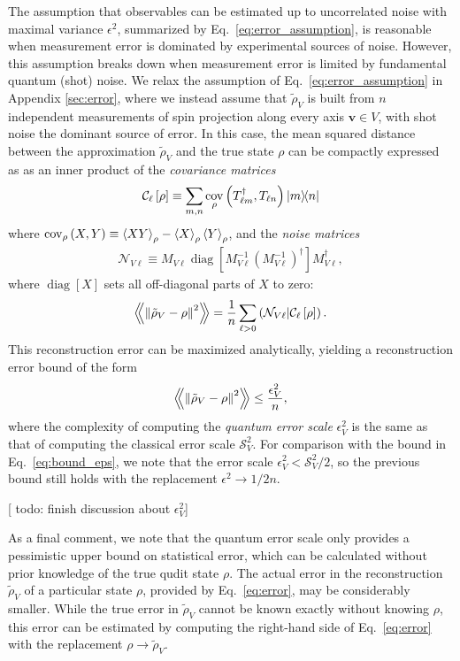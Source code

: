 \documentclass[notitlepage,twocolumn]{revtex4-2}
\newcommand{\f}[2]{\dfrac{#1}{#2}} %
\newcommand{\p}[1]{\left(#1\right)} %
\renewcommand{\sp}[1]{\left[#1\right]} %
\newcommand{\bk}{\Braket} %
\renewcommand{\v}{\bm} %
\newcommand{\Bbk}[1]
{\left\langle\!\!\left\langle #1 \right\rangle\!\!\right\rangle}
\newcommand{\C}{\mathcal{C}}
\newcommand{\N}{\mathcal{N}}
\renewcommand{\S}{\mathcal{S}}
\def\obk#1{\mathinner{({#1})}}
\DeclareMathOperator{\cov}{cov}
\DeclareMathOperator{\diag}{diag}
\newcommand{\red}[1]{{\color{red} #1}}
\begin{document}
The assumption that observables can be estimated up to uncorrelated noise with maximal variance $\epsilon^2$, summarized by Eq.~\eqref{eq:error_assumption}, is reasonable when measurement error is dominated by experimental sources of noise.
However, this assumption breaks down when measurement error is limited by fundamental quantum (shot) noise.
We relax the assumption of Eq.~\eqref{eq:error_assumption} in Appendix \ref{sec:error}, where we instead assume that $\tilde\rho_V$ is built from $n$ independent measurements of spin projection along every axis $\v v\in V$, with shot noise the dominant source of error.
In this case, the mean squared distance between the approximation $\tilde\rho_V$ and the true state $\rho$ can be compactly expressed as as an inner product of the {\it covariance matrices}
\begin{align}
  \C_\ell\sp{\rho} \equiv \sum_{m,n}
  \cov_\rho\p{T_{\ell m}^\dag, T_{\ell n}} \op{m}{n}
\end{align}
where $\cov_\rho\p{X,Y} \equiv \bk{XY}_\rho - \bk{X}_\rho \bk{Y}_\rho$, and the {\it noise matrices}
\begin{align}
  \N_{V\ell} \equiv M_{V\ell} \diag\sp{M_{V\ell}^{-1}
    \p{M_{V\ell}^{-1}}^\dag} M_{V\ell}^\dag,
\end{align}
where $\diag\sp{X}$ sets all off-diagonal parts of $X$ to zero:
\begin{align}
  \Bbk{\norm{\tilde\rho_V-\rho}^2}
  = \f1n \sum_{\ell>0} \obk{\N_{V\ell}|\C_\ell\sp{\rho}}.
  \label{eq:error}
\end{align}
This reconstruction error can be maximized analytically, yielding a reconstruction error bound of the form
\begin{align}
  \Bbk{\norm{\tilde\rho_V-\rho}^2} \le \f{\epsilon_V^2}{n},
  \label{eq:bound}
\end{align}
where the complexity of computing the {\it quantum error scale} $\epsilon_V^2$ is the same as that of computing the classical error scale $\S_V^2$.
For comparison with the bound in Eq.~\eqref{eq:bound_eps}, we note that the error scale $\epsilon_V^2<\S_V^2/2$, so the previous bound still holds with the replacement $\epsilon^2\to1/2n$.

[\red{todo: finish discussion about $\epsilon_V^2$}]

As a final comment, we note that the quantum error scale only provides a pessimistic upper bound on statistical error, which can be calculated without prior knowledge of the true qudit state $\rho$.
The actual error in the reconstruction $\tilde\rho_V$ of a particular state $\rho$, provided by Eq.~\eqref{eq:error}, may be considerably smaller.
While the true error in $\tilde\rho_V$ cannot be known exactly without knowing $\rho$, this error can be estimated by computing the right-hand side of Eq.~\eqref{eq:error} with the replacement $\rho\to\tilde\rho_V$.
\end{document}
